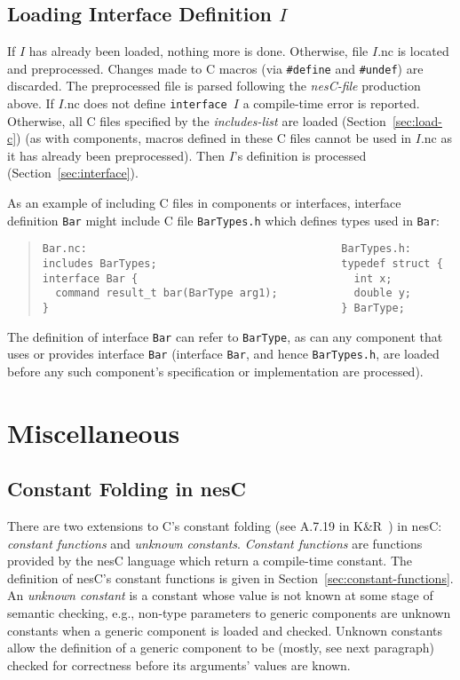 \documentclass[11pt,letterpaper]{article}
\newcommand{\code}[1]{{\tt #1}}
\newcommand{\file}[1]{{\tt #1}}
\newcommand{\nesc}{nesC\xspace}
\begin{document}
\subsection{Loading Interface Definition $I$}
\label{sec:load-intf}

If $I$ has already been loaded, nothing more is done. Otherwise, file
$I$.nc is located and preprocessed. Changes made to C macros (via
\code{\#define} and \code{\#undef}) are discarded. The preprocessed file is
parsed following the \emph{nesC-file} production above. If $I$.nc does not
define \code{interface $I$} a compile-time error is reported. Otherwise,
all C files specified by the \emph{includes-list} are loaded
(Section~\ref{sec:load-c}) (as with components, macros defined in these C
files cannot be used in $I$.nc as it has already been preprocessed). Then
$I$'s definition is processed (Section~\ref{sec:interface}).

As an example of including C files in components or interfaces, interface
definition \code{Bar} might include C file \file{BarTypes.h} which defines types
used in \code{Bar}:

\begin{quote} \begin{verbatim}
Bar.nc:                                        BarTypes.h:      
includes BarTypes;                             typedef struct { 
interface Bar {                                  int x;         
  command result_t bar(BarType arg1);            double y;      
}                                              } BarType;
\end{verbatim} \end{quote}

The definition of interface \code{Bar} can refer to \code{BarType}, as can
any component that uses or provides interface \code{Bar} (interface
\code{Bar}, and hence \file{BarTypes.h}, are loaded before any such
component's specification or implementation are processed).

\section{Miscellaneous}
\label{sec:misc}

\subsection{Constant Folding in \nesc}
\label{sec:constant-folding}

There are two extensions to C's constant folding (see A.7.19 in
K\&R~\cite{kandr}) in \nesc: \emph{constant functions} and \emph{unknown
constants}. \emph{Constant functions} are functions provided by the \nesc
language which return a compile-time constant. The definition of \nesc's
constant functions is given in Section~\ref{sec:constant-functions}. An
\emph{unknown constant} is a constant whose value is not known at some
stage of semantic checking, e.g., non-type parameters to generic components
are unknown constants when a generic component is loaded and
checked. Unknown constants allow the definition of a generic component to
be (mostly, see next paragraph) checked for correctness before its
arguments' values are known.
\end{document}
